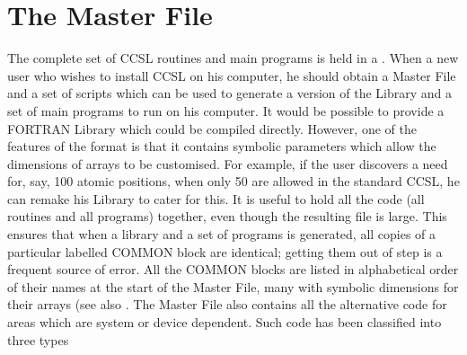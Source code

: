 \section{The Master File}
The complete set of CCSL routines and main programs is held in a . When a new user who wishes to install CCSL on his computer,
he should obtain a Master File and a set of 
 scripts which can be used to
generate a version of the Library and a set of main programs 
to run on his computer.
\p 
It would be possible to provide a FORTRAN Library which could be
compiled directly.  However, one of the features of the 
format is that it contains symbolic parameters which allow the dimensions 
of arrays to be customised. For example, if the user discovers a need for,
say, 100 atomic positions, when only 50 are allowed in the standard CCSL,
he can remake his Library to cater for this.
\p 
It is useful to hold all the code (all routines and all programs)
together, even though the resulting file is large. This 
ensures that when a library and a set of programs is generated, all copies 
of a particular labelled COMMON block are identical;  getting them
out of step is a frequent
source of error.  All the COMMON blocks are listed in alphabetical order
of their names at the start of the Master File, many with symbolic
dimensions for their arrays (see also 
.
\p 
The Master File also contains all the alternative code for areas which
are system or device dependent.  Such code has been classified into three types
